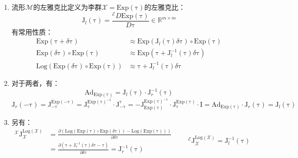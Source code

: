 \documentclass[12pt, onecolumn]{article}
\newcommand\Exp[1]{\mathrm{Exp}\left( #1\right) }
\newcommand\Log[1]{\mathrm{Log}\left( #1\right) }
\newcommand\bsm[1]{\boldsymbol{\mathrm{#1}}}
\begin{document}
\begin{enumerate}
\begin{enumerate}
	\item 流形$\mathcal{M}$的左雅克比定义为李群$\mathcal{X}=\Exp{\bsm\tau}$的左雅克比：
		\begin{equation}
		\bsm{J}_l(\bsm\tau)=\frac{^\mathcal{E}D\Exp{\bsm\tau}}{D\bsm\tau}\in\mathbb{R}^{m\times m}
		\end{equation}
	有常用性质：
	\begin{equation}
	\begin{aligned}
		\Exp{\bsm{\tau}+\delta\bsm{\tau}}&\approx\Exp{\bsm{J}_l(\bsm\tau)\delta\bsm{\tau}}\circ\Exp{\bsm\tau}
		\\
		\Exp{\delta\bsm\tau}\circ\Exp{\bsm\tau}&\approx\Exp{\bsm{\tau}+\bsm{J}_l^{-1}(\bsm\tau)\delta\bsm{\tau}}
		\\
		\Log{\Exp{\delta\bsm\tau}\circ\Exp{\bsm\tau}}&\approx\bsm{\tau}+\bsm{J}_l^{-1}(\bsm\tau)\delta\bsm{\tau}
	\end{aligned}
	\end{equation}	
	
	\item 对于两者，有：
	\begin{equation}
	\bsm{Ad}_{\Exp{\bsm{\tau}}}=\bsm{J}_l(\bsm\tau)\cdot\bsm{J}_r^{-1}(\bsm\tau)
	\end{equation}
	\begin{equation}
	\bsm{J}_r(-\bsm\tau)=\bsm{J}^{\Exp{-\bsm\tau}}_{-\bsm\tau}
	=\bsm{J}^{\Exp{\bsm\tau}^{-1}}_{\bsm\tau}\cdot\bsm{J}^{\bsm\tau}_{-\bsm\tau}
	=-\bsm{J}^{\Exp{\bsm\tau}^{-1}}_{\Exp{\bsm\tau}}\cdot\bsm{J}^{\Exp{\bsm\tau}}_{\bsm\tau}\cdot\bsm{I}
	=\bsm{Ad}_{\Exp{\bsm{\tau}}}\cdot\bsm{J}_r(\bsm\tau)=\bsm{J}_l(\bsm\tau)
	\end{equation}
	
	\item 另有：
	\begin{equation}
	\begin{aligned}
	^\mathcal{X}\bsm{J}^{\Log{\mathcal{X}}}_{\mathcal{\mathcal{X}}}&=
	\frac{\partial \left( \Log{\Exp{\bsm\tau}\circ\Exp{\delta\bsm\tau}}-\Log{\Exp{\bsm\tau}}\right)}{\partial \delta\bsm{\tau}}
	\\
	&=\frac{\partial \left( \bsm{\tau}+\bsm{J}_r^{-1}(\bsm\tau)\delta\bsm{\tau}-\bsm\tau\right)}{\partial \delta\bsm{\tau}}=\bsm{J}_r^{-1}(\bsm\tau)
	\end{aligned}
	\qquad
	^\mathcal{E}\bsm{J}^{\Log{\mathcal{X}}}_{\mathcal{\mathcal{X}}}
	=\bsm{J}_l^{-1}(\bsm\tau)
	\end{equation}
	\end{enumerate}
	
	\end{enumerate}
	
\end{document}
